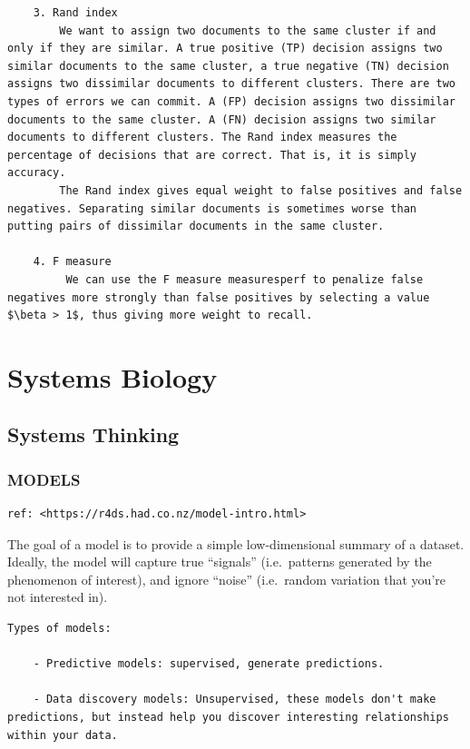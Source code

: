 \documentclass[
]{book}
\begin{document}
\begin{verbatim}
    3. Rand index
        We want to assign two documents to the same cluster if and only if they are similar. A true positive (TP) decision assigns two similar documents to the same cluster, a true negative (TN) decision assigns two dissimilar documents to different clusters. There are two types of errors we can commit. A (FP) decision assigns two dissimilar documents to the same cluster. A (FN) decision assigns two similar documents to different clusters. The Rand index measures the percentage of decisions that are correct. That is, it is simply accuracy.
        The Rand index gives equal weight to false positives and false negatives. Separating similar documents is sometimes worse than putting pairs of dissimilar documents in the same cluster.

    4. F measure
         We can use the F measure measuresperf to penalize false negatives more strongly than false positives by selecting a value $\beta > 1$, thus giving more weight to recall. 
\end{verbatim}

\hypertarget{systems-biology-1}{%
\chapter{Systems Biology}\label{systems-biology-1}}

\hypertarget{systems-thinking}{%
\section{Systems Thinking}\label{systems-thinking}}

\hypertarget{models}{%
\subsection{MODELS}\label{models}}

\begin{verbatim}
ref: <https://r4ds.had.co.nz/model-intro.html>
\end{verbatim}

The goal of a model is to provide a simple low-dimensional summary of a dataset. Ideally, the model will capture true ``signals'' (i.e.~patterns generated by the phenomenon of interest), and ignore ``noise'' (i.e.~random variation that you're not interested in).

\begin{verbatim}
Types of models:

    - Predictive models: supervised, generate predictions.

    - Data discovery models: Unsupervised, these models don't make predictions, but instead help you discover interesting relationships within your data.
\end{verbatim}
\end{document}
